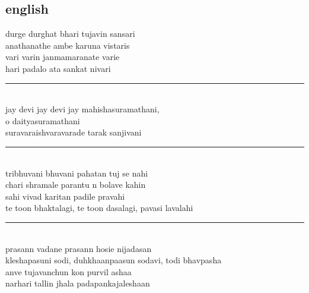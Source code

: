 \documentclass[letterpaper,twocolumn,openany,nodeprecatedcode]{dndbook}
\begin{document}
\begin{flushleft}
  \subsection*{english}
  durge durghat bhari tujavin sansari \\ anathanathe ambe karuna vistaris\\ vari varin janmamaranate varie \\ hari padalo ata sankat nivari \\
  \rule{\linewidth}{1pt} \\
  jay devi jay devi jay mahishasuramathani, \\ o daityasuramathani \\ suravaraishvaravarade tarak sanjivani \\
  \rule{\linewidth}{1pt} \\
  tribhuvani bhuvani pahatan tuj se nahi \\ chari shramale parantu n bolave kahin \\ sahi vivad karitan padile pravahi \\ te toon bhaktalagi, te toon dasalagi, pavasi lavalahi \\
  \rule{\linewidth}{1pt} \\
  prasann vadane prasann hosie nijadasan \\ kleshapasuni sodi, duhkhaanpaasun sodavi, todi bhavpasha \\ anve tujavanchun kon purvil ashaa \\ narhari tallin jhala padapankajaleshaan \\

\end{flushleft}
\pagebreak
\end{document}
